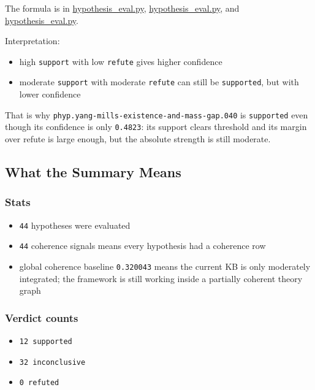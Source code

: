 \documentclass[
]{article}
\providecommand{\tightlist}{%
  \setlength{\itemsep}{0pt}\setlength{\parskip}{0pt}}
\begin{document}
The formula is in
\href{/Users/user/files/abducer/abducer/skills/common/hypothesis_eval.py:854}{hypothesis\_eval.py},
\href{/Users/user/files/abducer/abducer/skills/common/hypothesis_eval.py:1019}{hypothesis\_eval.py},
and
\href{/Users/user/files/abducer/abducer/skills/common/hypothesis_eval.py:1170}{hypothesis\_eval.py}.

Interpretation:

\begin{itemize}
\tightlist
\item
  high \texttt{support} with low \texttt{refute} gives higher confidence
\item
  moderate \texttt{support} with moderate \texttt{refute} can still be
  \texttt{supported}, but with lower confidence
\end{itemize}

That is why \texttt{phyp.yang-mills-existence-and-mass-gap.040} is
\texttt{supported} even though its confidence is only \texttt{0.4823}:
its support clears threshold and its margin over refute is large enough,
but the absolute strength is still moderate.

\subsection{What the Summary Means}\label{what-the-summary-means}

\subsubsection{Stats}\label{stats}

\begin{itemize}
\tightlist
\item
  \texttt{44} hypotheses were evaluated
\item
  \texttt{44} coherence signals means every hypothesis had a coherence
  row
\item
  global coherence baseline \texttt{0.320043} means the current KB is
  only moderately integrated; the framework is still working inside a
  partially coherent theory graph
\end{itemize}

\subsubsection{Verdict counts}\label{verdict-counts}

\begin{itemize}
\tightlist
\item
  \texttt{12\ supported}
\item
  \texttt{32\ inconclusive}
\item
  \texttt{0\ refuted}
\end{itemize}
\end{document}

